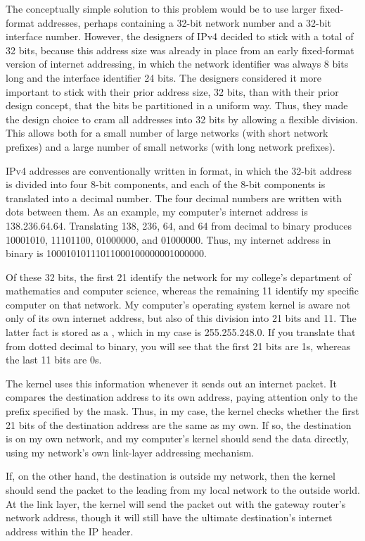 The conceptually simple solution to this problem would be to use larger
fixed-format addresses, perhaps containing a 32-bit network number and
a 32-bit interface number.  However, the designers of IPv4 decided to
stick with a total of 32 bits, because this address size was already
in place from an early fixed-format version of internet addressing, in
which the network identifier was always 8 bits long and the interface
identifier 24 bits.  The designers considered it more important to
stick with their prior address size, 32 bits, than with their prior
design concept, that the bits be partitioned in a uniform way.  Thus, they made the design choice to cram all
addresses into 32 bits by allowing a flexible division.  This allows
both for a small number of large networks (with short network
prefixes) and a large number of small networks (with long network
prefixes).

IPv4 addresses are conventionally written in  format, in which the 32-bit address is divided into four
8-bit components, and each of the 8-bit components is translated into
a decimal number.  The four decimal numbers are written with dots
between them.  As an example, my computer's internet address is
138.236.64.64.  Translating 138, 236, 64, and 64 from decimal to binary
produces 10001010, 11101100, 01000000, and 01000000.  Thus, my internet address
in binary is 10001010111011000100000001000000.

Of these 32 bits, the first 21 identify the network for my college's
department of mathematics and computer science, whereas the remaining
11 identify my specific computer on that network.  My computer's
operating system kernel is aware not only of its own internet address,
but also of this division into 21 bits and 11.  The latter fact is stored as a
, which in my case is 255.255.248.0.  If you translate
that from dotted decimal to binary, you will see that the first 21
bits are 1s, whereas the last 11 bits are 0s.

The kernel uses this information whenever it sends out an internet
packet.  It compares the destination address to its own address,
paying attention only to the prefix specified by the mask.  Thus, in
my case, the kernel checks whether the first 21 bits of the
destination address are the same as my own.  If so, the destination is
on my own network, and my computer's kernel should send the data
directly, using my network's own link-layer addressing mechanism.

If, on the other hand, the destination is outside my network, then the
kernel should send the packet to the 
leading from my local network to the outside world.  At the link
layer, the kernel will send the packet out with the gateway router's
network address, though it will still have the ultimate destination's
internet address within the IP header.

